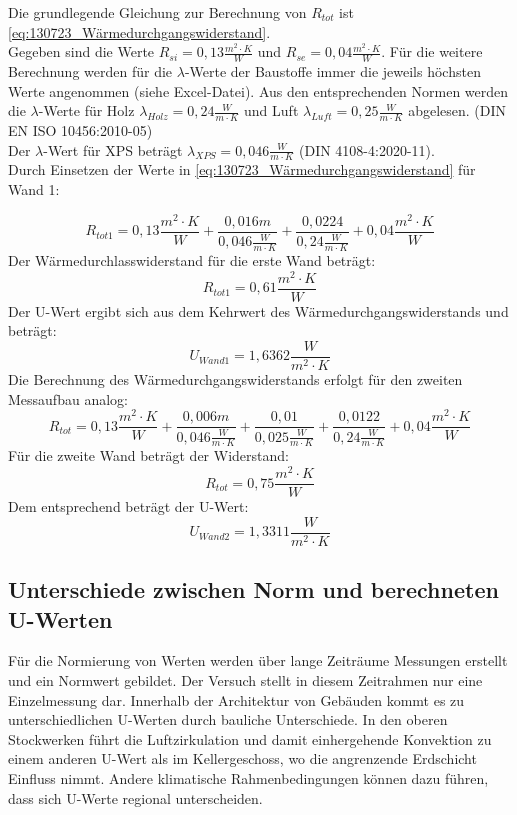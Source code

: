 Die grundlegende Gleichung zur Berechnung von $R_{tot}$ ist \autoref{eq:130723_Wärmedurchgangswiderstand}. \\
Gegeben sind die Werte $R_{si}=0,13\frac{m^2 \cdot K}{W}$ und $R_{se}=0,04\frac{m^2 \cdot K}{W}$.
Für die weitere Berechnung werden für die $\lambda$-Werte der Baustoffe immer die jeweils höchsten Werte angenommen (siehe Excel-Datei). Aus den entsprechenden Normen werden
die $\lambda$-Werte für Holz \cite[S.20]{lamda-holz-luft} $\lambda_{Holz}=0,24\frac{W}{m\cdot K}$ und Luft\cite[S. 15]{lamda-holz-luft} $\lambda_{Luft}=0,25\frac{W}{m\cdot K}$ abgelesen. (DIN EN ISO 10456:2010-05)
\\Der $\lambda$-Wert für XPS \cite[S.23]{lamda-xps} beträgt $\lambda_{XPS}=0,046\frac{W}{m\cdot K}$ (DIN 4108-4:2020-11). \\ Durch Einsetzen der Werte in \autoref{eq:130723_Wärmedurchgangswiderstand} für Wand 1:

$$R_{tot1}=0,13 \frac{m^2 \cdot K}{W}+ \frac{0,016m}{0,046 \frac{W}{m \cdot K}}+\frac{0,0224}{0,24 \frac{W}{m \cdot K}} +0,04 \frac{m^2 \cdot K}{W}$$
Der Wärmedurchlasswiderstand für die erste Wand beträgt:
$$R_{tot1}=0,61\frac{m^2 \cdot K}{W}$$
Der U-Wert ergibt sich aus dem Kehrwert des Wärmedurchgangswiderstands und beträgt:
$$U_{Wand 1}=1,6362 \frac{W}{m^2 \cdot K}$$
\newpage
Die Berechnung des Wärmedurchgangswiderstands erfolgt für den zweiten Messaufbau analog:
$$R_{tot}=0,13\frac{m^2 \cdot K}{W}+ \frac{0,006m}{0,046\frac{W}{m\cdot K}}+ \frac{0,01}{0,025\frac{W}{m\cdot K}} +\frac{0,0122}{0,24\frac{W}{m\cdot K}} +0,04\frac{m^2 \cdot K}{W}$$
Für die zweite Wand beträgt der Widerstand:
$$R_{tot}=0,75\frac{m^2 \cdot K}{W}$$
Dem entsprechend beträgt der U-Wert:
$$U_{Wand 2}=1,3311 \frac{W}{m^2 \cdot K}$$



\subsection{Unterschiede zwischen Norm und berechneten U-Werten}
Für die Normierung von Werten werden über lange Zeiträume Messungen erstellt und ein Normwert gebildet.
Der Versuch stellt in diesem Zeitrahmen nur eine Einzelmessung dar. 
Innerhalb der Architektur von Gebäuden kommt es zu unterschiedlichen U-Werten durch bauliche Unterschiede.
In den oberen Stockwerken führt die Luftzirkulation und damit einhergehende Konvektion zu einem anderen U-Wert als im Kellergeschoss, wo die angrenzende Erdschicht Einfluss nimmt.
Andere klimatische Rahmenbedingungen können dazu führen, dass sich U-Werte regional unterscheiden. 
